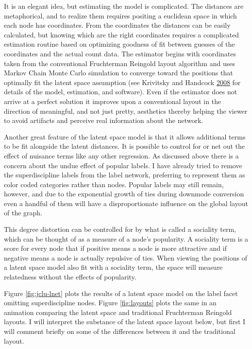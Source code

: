 \documentclass[]{book}
\theoremstyle{definition}
\theoremstyle{definition}
\theoremstyle{definition}
\theoremstyle{remark}
\begin{document}
It is an elegant idea, but estimating the model is complicated. The
distances are metaphorical, and to realize them requires positing a
euclidean space in which each node has coordinates. From the coordinates
the distances can be easily calculated, but knowing which are the right
coordinates requires a complicated estimation routine based on
optimizing goodness of fit between guesses of the coordinates and the
actual count data. The estimator begins with coordinates taken from the
conventional Fruchterman Reingold layout algorithm and uses Markov Chain
Monte Carlo simulation to converge toward the positions that optimally
fit the latent space assumption (see Krivitsky and Handcock
\protect\hyperlink{ref-Krivitsky2008Fitting}{2008} for details of the
model, estimation, and software). Even if the estimator does not arrive
at a perfect solution it improves upon a conventional layout in the
direction of meaningful, and not just pretty, aesthetics thereby helping
the viewer to avoid artifacts and perceive real information about the
network.

Another great feature of the latent space model is that it allows
additional terms to be fit alongside the latent distances. It is
possible to control for or net out the effect of nuisance terms like any
other regression. As discussed above there is a concern about the undue
effect of popular labels. I have already tried to remove the
superdiscipline labels from the label network, preferring to represent
them as color coded categories rather than nodes. Popular labels may
still remain, however, and due to the exponential growth of ties during
downmode conversion even a handful of them will have a disproportionate
influence on the global layout of the graph.

This degree distortion can be controlled for by what is called a
sociality term, which can be thought of as a measure of a node's
popularity. A sociality term is a score for every node that if positive
means a node is more attractive and if negative means a node is actually
repulsive of ties. When viewing the positions of a latent space model
also fit with a sociality term, the space will measure relatedness
without the effects of popularity.

Figure \ref{fig:jclu-lnet} plots the results of a latent space model on
the label facet omitting superdiscipline nodes. Figure \ref{fig:layouts}
plots the same in an animation comparing the latent space and
traditional Fruchterman Reingold layouts. I will interpret the substance
of the latent space layout below, but first I will comment briefly on
some of the differences between it and the traditional layout.
\end{document}
